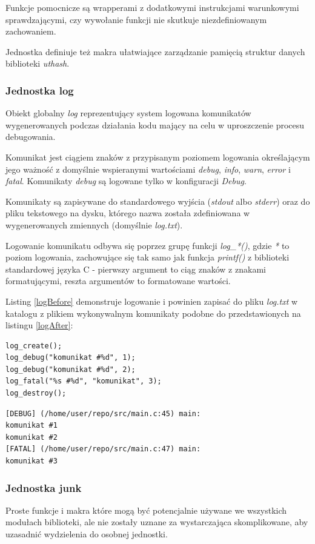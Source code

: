 Funkcje pomocnicze są wrapperami z dodatkowymi instrukcjami warunkowymi sprawdzającymi, czy wywołanie funkcji nie skutkuje niezdefiniowanym zachowaniem.

Jednostka definiuje też makra ułatwiające zarządzanie pamięcią struktur danych biblioteki \textit{uthash}.


\subsubsection{Jednostka log}
Obiekt globalny \textit{log} reprezentujący system logowana komunikatów wygenerowanych podczas działania kodu mający na celu w uproszczenie procesu debugowania.

Komunikat jest ciągiem znaków z przypisanym poziomem logowania określającym jego ważność z domyślnie wspieranymi wartościami \textit{debug}, \textit{info}, \textit{warn}, \textit{error} i \textit{fatal}.
Komunikaty \textit{debug} są logowane tylko w konfiguracji \textit{Debug}.

Komunikaty są zapisywane do standardowego wyjścia (\textit{stdout} albo \textit{stderr}) oraz do pliku tekstowego na dysku, którego nazwa została zdefiniowana w wygenerowanych zmiennych (domyślnie \textit{log.txt}).

Logowanie komunikatu odbywa się poprzez grupę funkcji \textit{log\_*()}, gdzie \textit{*} to poziom logowania, zachowujące się tak samo jak funkcja \textit{printf()} z biblioteki standardowej języka C - pierwszy argument to ciąg znaków z znakami formatującymi, reszta argumentów to formatowane wartości.

Listing \ref{logBefore} demonstruje logowanie i powinien zapisać do pliku \textit{log.txt} w katalogu z plikiem wykonywalnym komunikaty podobne do przedstawionych na listingu \ref{logAfter}:
\lstset{language=C}
\begin{lstlisting}[caption={Demonstracja logowania},captionpos=b,label={logBefore}]
log_create();
log_debug("komunikat #%d", 1);
log_debug("komunikat #%d", 2);
log_fatal("%s #%d", "komunikat", 3);
log_destroy();
\end{lstlisting}

\lstset{language=verbatim}
\begin{lstlisting}[caption={Wynik logowania},captionpos=b,label={logAfter}]
[DEBUG] (/home/user/repo/src/main.c:45) main:
komunikat #1
komunikat #2
[FATAL] (/home/user/repo/src/main.c:47) main:
komunikat #3
\end{lstlisting}

\subsubsection{Jednostka junk}
Proste funkcje i makra które mogą być potencjalnie używane we wszystkich modułach biblioteki, ale nie zostały uznane za wystarczająca skomplikowane, aby uzasadnić wydzielenia do osobnej jednostki.

